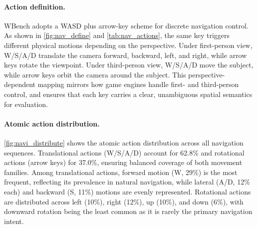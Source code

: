\documentclass{llmxive}
\providecommand{\benchmark}{WBench }
\begin{document}
\paragraph{Action definition.}
\benchmark adopts a WASD plus arrow-key scheme for discrete navigation control. As shown in \cref{fig:nav_define} and \cref{tab:nav_actions}, the same key triggers different physical motions depending on the perspective. Under first-person view, W/S/A/D translate the camera forward, backward, left, and right, while arrow keys rotate the viewpoint. Under third-person view, W/S/A/D move the subject, while arrow keys orbit the camera around the subject. This perspective-dependent mapping mirrors how game engines handle first- and third-person control, and ensures that each key carries a clear, unambiguous spatial semantics for evaluation.

\paragraph{Atomic action distribution.}
\cref{fig:navi_distribute} shows the atomic action distribution across all navigation sequences. Translational actions (W/S/A/D) account for 62.8\% and rotational actions (arrow keys) for 37.0\%, ensuring balanced coverage of both movement families. Among translational actions, forward motion (W, 29\%) is the most frequent, reflecting its prevalence in natural navigation, while lateral (A/D, 12\% each) and backward (S, 11\%) motions are evenly represented. Rotational actions are distributed across left (10\%), right (12\%), up (10\%), and down (6\%), with downward rotation being the least common as it is rarely the primary navigation intent.
\end{document}
